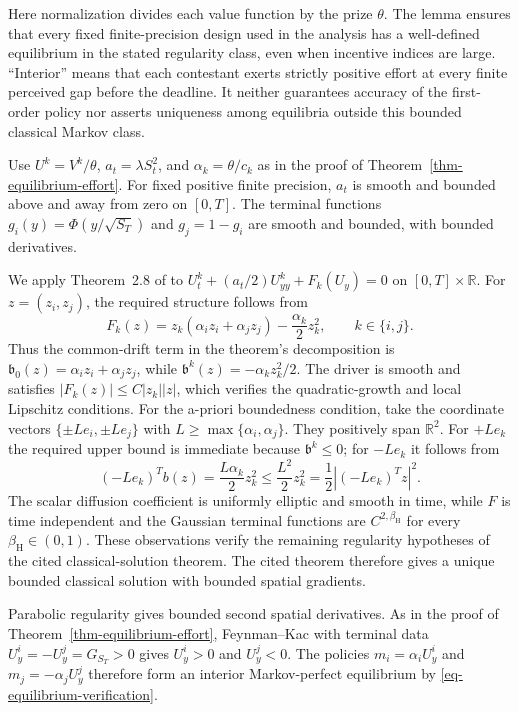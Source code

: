 \documentclass[mnsc]{informs3}
\begin{document}
\begin{APPENDICES}
{{Here normalization divides each value function by the prize $\theta$. The lemma ensures that every fixed finite-precision design used in the analysis has a well-defined equilibrium in the stated regularity class, even when incentive indices are large. ``Interior'' means that each contestant exerts strictly positive effort at every finite perceived gap before the deadline. It neither guarantees accuracy of the first-order policy nor asserts uniqueness among equilibria outside this bounded classical Markov class.}

Use $U^k=V^k/\theta$, $a_t=\lambda S_t^2$, and
$\alpha_k=\theta/c_k$ as in the proof of
Theorem~\ref{thm-equilibrium-effort}. For fixed positive finite precision,
$a_t$ is smooth and bounded above and away from zero on $[0,T]$.
The terminal functions $g_i(y)=\Phi(y/\sqrt{S_T})$ and $g_j=1-g_i$
are smooth and bounded, with bounded derivatives.

We apply Theorem~2.8 of \citet{Jackson2023Quadratic} to
$U_t^k+(a_t/2)U_{yy}^k+F_k(U_y)=0$ on $[0,T]\times\mathbb R$.
For $z=(z_i,z_j)$, the required structure follows from
\[
F_k(z)=z_k(\alpha_i z_i+\alpha_j z_j)
-\frac{\alpha_k}{2}z_k^2,\qquad k\in\{i,j\}.
\]
Thus the common-drift term in the theorem's decomposition is
$\mathfrak b_0(z)=\alpha_i z_i+\alpha_j z_j$, while
$\mathfrak b^k(z)=-\alpha_kz_k^2/2$. The driver is smooth and satisfies
$|F_k(z)|\leq C|z_k||z|$, which verifies the quadratic-growth and local
Lipschitz conditions. For the a-priori boundedness condition, take the
coordinate vectors $\{\pm L e_i,\pm L e_j\}$ with
$L\geq\max\{\alpha_i,\alpha_j\}$. They positively span $\mathbb R^2$.
For $+Le_k$ the required upper bound is immediate because $\mathfrak b^k\leq0$;
for $-Le_k$ it follows from
\[
(-Le_k)^Tb(z)=\frac{L\alpha_k}{2}z_k^2
\leq\frac{L^2}{2}z_k^2
=\frac12|(-Le_k)^Tz|^2.
\]
The scalar diffusion coefficient is uniformly elliptic and smooth in
time, while $F$ is time independent and the Gaussian terminal functions
are $C^{2,\beta_{\mathrm H}}$ for every $\beta_{\mathrm H}\in(0,1)$. These observations verify the
remaining regularity hypotheses of the cited classical-solution theorem.
The cited theorem therefore gives a unique bounded classical solution with
bounded spatial gradients.

Parabolic regularity gives bounded second spatial derivatives.
As in the proof of Theorem~\ref{thm-equilibrium-effort},
Feynman--Kac with terminal data $U_y^i=-U_y^j=G_{S_T}>0$ gives
$U_y^i>0$ and $U_y^j<0$. The policies $m_i=\alpha_iU_y^i$ and
$m_j=-\alpha_jU_y^j$ therefore form an interior Markov-perfect
equilibrium by \eqref{eq-equilibrium-verification}.
\Halmos
\endproof
}


\end{APPENDICES}
\end{document}
